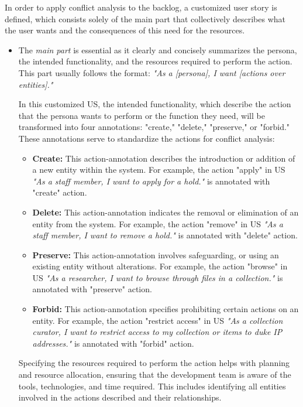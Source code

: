 \begin{definition}
	In order to apply conflict analysis to the backlog, a customized user story is defined, which consists solely of the main part that collectively describes what the user wants and the consequences of this need for the resources.
\begin{itemize}
	\item The \textit{main part} is essential as it clearly and concisely summarizes the persona, the intended functionality, and the resources required to perform the action. This part usually follows the format: \textit{"As a [persona], I want [actions over entities]."}
	
	In this customized US, the intended functionality, which describe the action that the persona wants to perform or the function they need, will be transformed into four annotations: "create," "delete," "preserve," or "forbid." These annotations serve to standardize the actions for conflict analysis:
	
	\begin{itemize}
		\item \textbf{Create:} This action-annotation describes the introduction or addition of a new entity within the system. For example, the action "apply" in US \textit{"As a staff member, I want to apply for a hold."} is annotated with "create" action.
		
		\item \textbf{Delete:} This action-annotation indicates the removal or elimination of an entity from the system. For example, the action "remove" in US \textit{"As a staff member, I want to remove a hold."} is annotated with "delete" action.
		
		\item \textbf{Preserve:} This action-annotation involves safeguarding, or using an existing entity without alterations. For example, the action "browse" in US \textit{"As a researcher, I want to browse through files in a collection."} is annotated with "preserve" action.
		
		\item \textbf{Forbid:} This action-annotation specifies prohibiting certain actions on an entity. For example, the action "restrict access" in US \textit{"As a collection curator, I want to restrict access to my collection or items to duke IP addresses."} is annotated with "forbid" action.
	\end{itemize}
	
	Specifying the resources required to perform the action helps with planning and resource allocation, ensuring that the development team is aware of the tools, technologies, and time required. This includes identifying all entities involved in the actions described and their relationships.
	

\end{itemize}
\end{definition}
